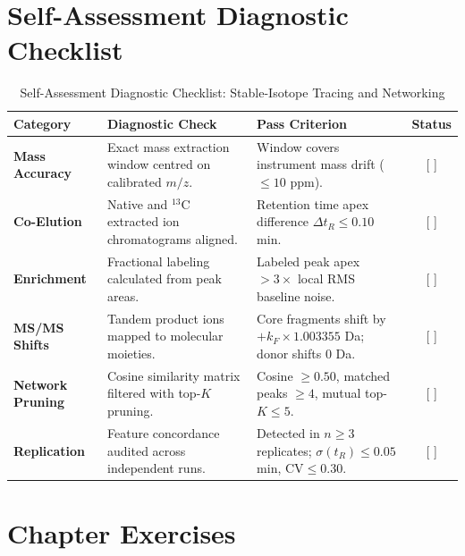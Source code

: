 \documentclass[11pt,twoside,openright]{book}
\begin{document}
\section{Self-Assessment Diagnostic Checklist}

\begin{table}[ht]
\centering
\caption{Self-Assessment Diagnostic Checklist: Stable-Isotope Tracing and Networking}
\label{tab:diagnostic_checklist}
\small
\begin{tabularx}{\textwidth}{l p{5.5cm} X c}
\toprule
\textbf{Category} & \textbf{Diagnostic Check} & \textbf{Pass Criterion} & \textbf{Status} \\
\midrule
\textbf{Mass Accuracy} & Exact mass extraction window centred on calibrated $m/z$. & Window covers instrument mass drift ($\le 10$ ppm). & [ ] \\
\addlinespace
\textbf{Co-Elution} & Native and $^{13}\text{C}$ extracted ion chromatograms aligned. & Retention time apex difference $\Delta t_R \le 0.10$ min. & [ ] \\
\addlinespace
\textbf{Enrichment} & Fractional labeling calculated from peak areas. & Labeled peak apex $> 3 \times$ local RMS baseline noise. & [ ] \\
\addlinespace
\textbf{MS/MS Shifts} & Tandem product ions mapped to molecular moieties. & Core fragments shift by $+k_F \times 1.003355$ Da; donor shifts 0 Da. & [ ] \\
\addlinespace
\textbf{Network Pruning} & Cosine similarity matrix filtered with top-$K$ pruning. & Cosine $\ge 0.50$, matched peaks $\ge 4$, mutual top-$K \le 5$. & [ ] \\
\addlinespace
\textbf{Replication} & Feature concordance audited across independent runs. & Detected in $n \ge 3$ replicates; $\sigma(t_R) \le 0.05$ min, $\text{CV} \le 0.30$. & [ ] \\
\bottomrule
\end{tabularx}
\end{table}

\FloatBarrier

\section{Chapter Exercises}
\end{document}
